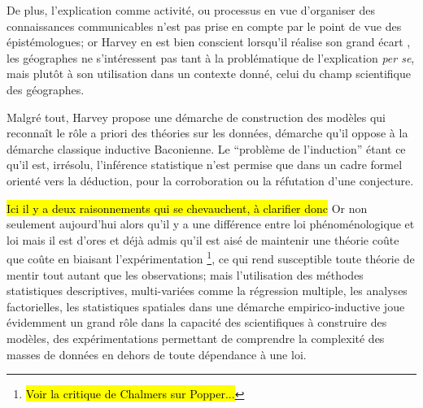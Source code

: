 De plus, l'explication comme activité, ou processus en vue d'organiser des connaissances communicables n'est pas prise en compte par le point de vue des épistémologues; or Harvey en est bien conscient lorsqu'il réalise son grand écart \autocite[10]{Harvey1969}, les géographes ne s’intéressent pas tant à la problématique de l'explication \textit{per se}, mais plutôt à son utilisation dans un contexte donné, celui du champ scientifique des géographes.

Malgré tout, Harvey propose une démarche de construction des modèles qui reconnaît le rôle a priori des théories sur les données, démarche qu'il oppose à la démarche classique inductive Baconienne. Le \enquote{problème de l'induction} étant ce qu'il est, irrésolu, l'inférence statistique n'est permise que dans un cadre formel orienté vers la déduction, pour la corroboration ou la réfutation d'une conjecture.

\hl{Ici il y a deux raisonnements qui se chevauchent, à clarifier donc }
Or non seulement aujourd'hui alors qu'il y a une différence entre loi phénoménologique et loi mais il est d'ores et déjà admis qu'il est aisé de maintenir une théorie coûte que coûte en biaisant l'expérimentation \footnote{\hl{Voir la critique de Chalmers sur Popper...} }, ce qui rend susceptible toute théorie de mentir tout autant que les observations; mais l'utilisation des méthodes statistiques descriptives, multi-variées comme la régression multiple, les analyses factorielles, les statistiques spatiales dans une démarche empirico-inductive joue évidemment un grand rôle dans la capacité des scientifiques à construire des modèles, des expérimentations permettant de comprendre la complexité des masses de données en dehors de toute dépendance à une loi. %


